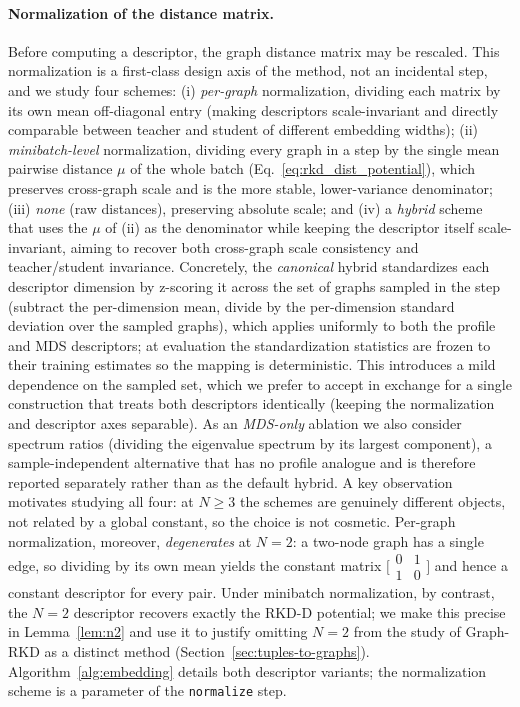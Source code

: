 \documentclass[11pt,letterpaper]{article}
\begin{document}
\paragraph{Normalization of the distance matrix.} Before computing a descriptor, the
graph distance matrix may be rescaled. This normalization is a first-class design axis
of the method, not an incidental step, and we study four schemes: (i) \emph{per-graph}
normalization, dividing each matrix by its own mean off-diagonal entry (making
descriptors scale-invariant and directly comparable between teacher and student of
different embedding widths); (ii) \emph{minibatch-level} normalization, dividing every
graph in a step by the single mean pairwise distance $\mu$ of the whole batch
(Eq.~\ref{eq:rkd_dist_potential}), which preserves cross-graph scale and is the more
stable, lower-variance denominator; (iii) \emph{none} (raw distances), preserving
absolute scale; and (iv) a \emph{hybrid} scheme that uses the $\mu$ of (ii) as the
denominator while keeping the descriptor itself scale-invariant, aiming to recover
both cross-graph scale consistency and teacher/student invariance. Concretely, the
\emph{canonical} hybrid standardizes each descriptor dimension by z-scoring it across
the set of graphs sampled in the step (subtract the per-dimension mean, divide by the
per-dimension standard deviation over the sampled graphs), which applies uniformly to
both the profile and MDS descriptors; at evaluation the standardization statistics are
frozen to their training estimates so the mapping is deterministic. This introduces a
mild dependence on the sampled set, which we prefer to accept in exchange for a single
construction that treats both descriptors identically (keeping the normalization and
descriptor axes separable). As an \emph{MDS-only} ablation we also consider spectrum
ratios (dividing the eigenvalue spectrum by its largest component), a
sample-independent alternative that has no profile analogue and is therefore reported
separately rather than as the default hybrid. A key observation motivates studying all
four: at $N \geq 3$ the schemes are genuinely different objects, not related by a
global constant, so the choice is not cosmetic. Per-graph normalization, moreover,
\emph{degenerates} at $N = 2$: a two-node graph has a single edge, so dividing by its
own mean yields the constant matrix
$\bigl[\begin{smallmatrix}0&1\\1&0\end{smallmatrix}\bigr]$ and hence a constant
descriptor for every pair. Under minibatch normalization, by contrast, the $N = 2$
descriptor recovers exactly the RKD-D potential; we make this precise in
Lemma~\ref{lem:n2} and use it to justify omitting $N = 2$ from the study of Graph-RKD
as a distinct method (Section~\ref{sec:tuples-to-graphs}). Algorithm~\ref{alg:embedding}
details both descriptor variants; the normalization scheme is a parameter of the
\texttt{normalize} step.
\end{document}
